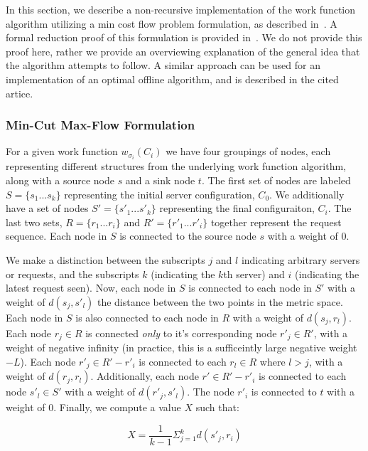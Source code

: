 In this section, we describe a non-recursive implementation of the work function algorithm utilizing a min cost flow problem formulation, as described in~\cite{mcfp2011}. A formal reduction proof of this formulation is provided in~\cite{mcfp2011}. We do not provide this proof here, rather we provide an overviewing explanation of the general idea that the algorithm attempts to follow. A similar approach can be used for an implementation of an optimal offline algorithm, and is described in the cited artice.

\subsubsection*{Min-Cut Max-Flow Formulation}
For a given work function $w_{\sigma_i}(C_i)$ we have four groupings of nodes, each representing different structures from the underlying work function algorithm, along with a source node $s$ and a sink node $t$. The first set of nodes are labeled $S = \{s_1 ... s_k\}$ representing the initial server configuration, $C_0$. We additionally have a set of nodes $S' = \{s'_1 ... s'_k\}$ representing the final configuraiton, $C_i$. The last two sets, $R = \{r_1 ... r_i\}$ and $R' = \{r'_1 ... r'_i\}$ together represent the request sequence. Each node in $S$ is connected to the source node $s$ with a weight of $0$.

We make a distinction between the subscripts $j$ and $l$ indicating arbitrary servers or requests, and the subscripts $k$ (indicating the $k$th server) and $i$ (indicating the latest request seen). Now, each node in $S$ is connected to each node in $S'$ with a weight of $d(s_j, s'_l)$ the distance between the two points in the metric space. Each node in $S$ is also connected to each node in $R$ with a weight of $d(s_j, r_l)$. Each node $r_j \in R$ is connected \textit{only} to it's corresponding node $r'_j\in R'$, with a weight of negative infinity (in practice, this is a sufficeintly large negative weight $-L$). Each node $r'_j \in R' - r'_i$ is connected to each $r_l \in R$ where $l > j$, with a weight of $d(r_j, r_l)$. Additionally, each node $r' \in R'-r'_i$ is connected to each node $s'_l \in S'$ with a weight of $d(r'_j, s'_l)$. The node $r'_i$ is connected to $t$ with a weight of $0$. Finally, we compute a value $X$ such that:

\begin{equation*}
    X = \frac{1}{k-1} \Sigma_{j=1}^{k} d(s'_j, r_i)
\end{equation*}

